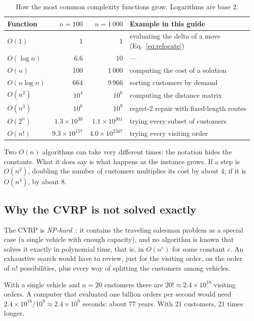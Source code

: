 \documentclass[11pt,a4paper]{article}
\begin{document}
\begin{table}[H]
\centering
\caption{How the most common complexity functions grow. Logarithms are base 2.}
\label{tab:crecimiento}
\small
\begin{tabular}{@{}lrrl@{}}
\toprule
Function & $n=100$ & $n=1\,000$ & Example in this guide \\
\midrule
$O(1)$        & 1 & 1 & evaluating the delta of a move (Eq.~\ref{eq:relocate}) \\
$O(\log n)$   & 6.6 & 10 & --- \\
$O(n)$        & 100 & 1\,000 & computing the cost of a solution \\
$O(n\log n)$  & 664 & 9\,966 & sorting customers by demand \\
$O(n^2)$      & $10^4$ & $10^6$ & computing the distance matrix \\
$O(n^3)$      & $10^6$ & $10^9$ & regret-2 repair with fixed-length routes \\
$O(2^n)$      & $1.3\times10^{30}$ & $1.1\times10^{301}$ & trying every subset of customers \\
$O(n!)$       & $9.3\times10^{157}$ & $4.0\times10^{2567}$ & trying every visiting order \\
\bottomrule
\end{tabular}
\end{table}

\begin{ideaclave}
Two $O(n)$ algorithms can take very different times: the notation hides the constants. What it does
say is what happens as the instance grows. If a step is $O(n^2)$, doubling the number of customers
multiplies its cost by about 4; if it is $O(n^3)$, by about 8.
\end{ideaclave}

\subsection{Why the CVRP is not solved exactly}

The CVRP is \emph{NP-hard}~\cite{lenstra1981}: it contains the traveling salesman problem as a special
case (a single vehicle with enough capacity), and no algorithm is known that solves it exactly in
polynomial time, that is, in $O(n^c)$ for some constant $c$. An exhaustive search would have to
review, just for the visiting order, on the order of $n!$ possibilities, plus every way of splitting
the customers among vehicles.

\begin{ejemplo}
With a single vehicle and $n=20$ customers there are $20!\approx2.4\times10^{18}$ visiting orders. A
computer that evaluated one billion orders per second would need
$2.4\times10^{18}/10^9\approx2.4\times10^{9}$ seconds: about 77 years. With 21 customers, 21 times
longer.
\end{ejemplo}
\end{document}
